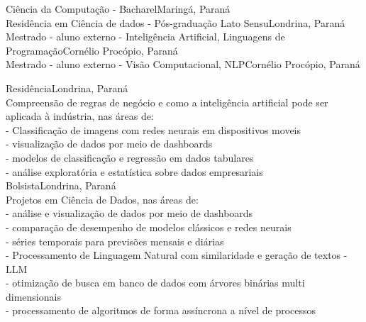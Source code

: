 \documentclass[
    10pt,
    english,
]{article}
\begin{document}
{Ciência da Computação - Bacharel}{Maringá, Paraná}{}
\\
{Residência em Ciência de dados - Pós-graduação Lato Sensu}{Londrina, Paraná}{}
\\
{Mestrado - aluno externo - Inteligência Artificial, Linguagens de Programação}{Cornélio Procópio, Paraná}{}
\\
{Mestrado - aluno externo - Visão Computacional, NLP}{Cornélio Procópio, Paraná}{}

{Residência}{Londrina, Paraná \\}{Compreensão de regras de negócio e como a inteligência artificial pode ser aplicada à indústria, nas áreas de: \\
    \tab - Classificação de imagens com redes neurais em dispositivos moveis \\
    \tab - visualização de dados por meio de dashboards \\
    \tab - modelos de classificação e regressão em dados tabulares \\
    \tab - análise exploratória e estatística sobre dados empresariais}
\\
{Bolsista}{Londrina, Paraná \\}{Projetos em Ciência de Dados, nas áreas de: \\
    \tab - análise e visualização de dados por meio de dashboards \\
    \tab - comparação de desempenho de modelos clássicos e redes neurais \\
    \tab - séries temporais para previsões mensais e diárias \\
    \tab - Processamento de Linguagem Natural com similaridade e geração de textos - LLM \\
    \tab - otimização de busca em banco de dados com árvores binárias multi dimensionais \\
    \tab - processamento de algoritmos de forma assíncrona a nível de processos}
\end{document}
